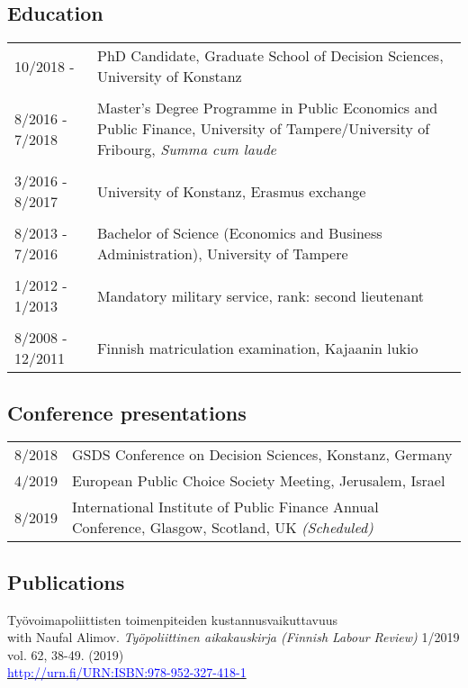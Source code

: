 \documentclass[16pt]{article}
\begin{document}
\subsection*{Education}
\begin{tabular}{@{}p{1.5in}p{5in}}
10/2018 -          & PhD Candidate, Graduate School of Decision Sciences, University of Konstanz \\
                        
\\
8/2016 - 7/2018 & Master's Degree Programme in Public Economics and Public Finance, University of Tampere/University of Fribourg, \textit{Summa cum laude}\\
\\
3/2016 - 8/2017 & University of Konstanz, Erasmus exchange \\
\\
8/2013 - 7/2016 & Bachelor of Science (Economics and Business Administration), University of Tampere\\
\\
1/2012 - 1/2013 & Mandatory military service, rank: second lieutenant\\
\\
8/2008 - 12/2011 & Finnish matriculation examination, Kajaanin lukio
\end{tabular}

\subsection*{Conference presentations}
\begin{tabular}{@{}p{1.5in}p{5in}}
8/2018             & GSDS Conference on Decision Sciences, Konstanz, Germany\\
4/2019             & European Public Choice Society Meeting, Jerusalem, Israel\\
8/2019             & International Institute of Public Finance Annual Conference, Glasgow, Scotland, UK \textit{(Scheduled)}\\
\end{tabular}

\subsection*{Publications}

\noindent Ty\"{o}voimapoliittisten toimenpiteiden kustannusvaikuttavuus \\
\noindent with Naufal Alimov. \textit{Ty\"{o}poliittinen aikakauskirja (Finnish Labour Review)} 1/2019 vol. 62, 38-49.  (2019) \\
\noindent \href{http://urn.fi/URN:ISBN:978-952-287-645-4}{\textcolor{blue}{http://urn.fi/URN:ISBN:978-952-327-418-1}} \\
\end{document}
